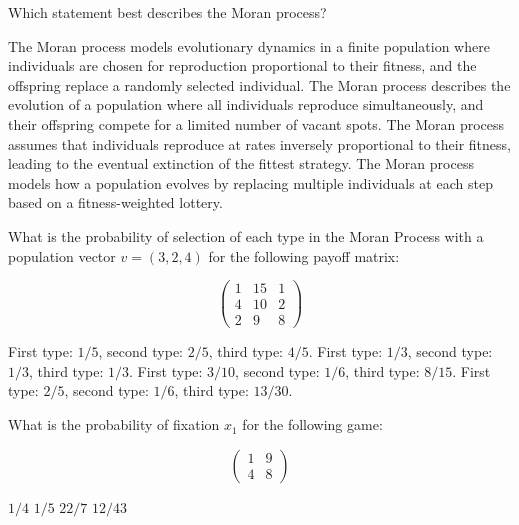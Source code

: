 \documentclass{exam}
\begin{document}
\begin{questions}
        
    \question
    Which statement best describes the Moran process?

    \begin{checkboxes}
        \choice The Moran process models evolutionary dynamics in a finite population where individuals are chosen for reproduction proportional to their fitness, and the offspring replace a randomly selected individual.
            \choice The Moran process describes the evolution of a population where all individuals reproduce simultaneously, and their offspring compete for a limited number of vacant spots.
            \choice The Moran process assumes that individuals reproduce at rates inversely proportional to their fitness, leading to the eventual extinction of the fittest strategy.
            \choice The Moran process models how a population evolves by replacing multiple individuals at each step based on a fitness-weighted lottery.
    \end{checkboxes}

    \question What is the probability of selection of each type in the Moran Process
    with a population vector \(v=(3, 2, 4)\) for the following payoff matrix:

    \[
        \begin{pmatrix}
            1 & 15 & 1\\
            4 & 10 & 2\\
            2 & 9  & 8
        \end{pmatrix}
    \]

    \begin{checkboxes}
        \choice First type: \(1/5\), second type: \(2/5\), third type: \(4/5\).
        \choice First type: \(1/3\), second type: \(1/3\), third type: \(1/3\).
        \choice First type: \(3/10\), second type: \(1/6\), third type: \(8/15\).
        \choice First type: \(2/5\), second type: \(1/6\), third type: \(13/30\).
    \end{checkboxes}

    \question What is the probability of fixation \(x_1\) for the following
    game:

    \[
        \begin{pmatrix}
        1 & 9\\
        4 & 8
        \end{pmatrix}
    \]

    \begin{checkboxes}
        \choice \(1/4\)
        \choice \(1/5\)
        \choice \(22/7\)
        \choice \(12/43\)
\end{checkboxes}

\end{questions}
\end{document}
